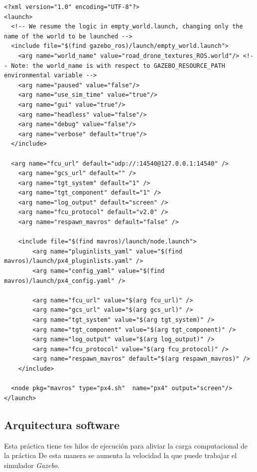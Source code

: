 \lstset{language=XML, breaklines=true, basicstyle=\footnotesize}
\begin{lstlisting}[frame=single]
<?xml version="1.0" encoding="UTF-8"?>
<launch>
  <!-- We resume the logic in empty_world.launch, changing only the name of the world to be launched -->
  <include file="$(find gazebo_ros)/launch/empty_world.launch">
    <arg name="world_name" value="road_drone_textures_ROS.world"/> <!-- Note: the world_name is with respect to GAZEBO_RESOURCE_PATH environmental variable -->
    <arg name="paused" value="false"/>
    <arg name="use_sim_time" value="true"/>
    <arg name="gui" value="true"/>
    <arg name="headless" value="false"/>
    <arg name="debug" value="false"/>
    <arg name="verbose" default="true"/>
  </include>

  <arg name="fcu_url" default="udp://:14540@127.0.0.1:14540" />
	<arg name="gcs_url" default="" />
	<arg name="tgt_system" default="1" />
	<arg name="tgt_component" default="1" />
	<arg name="log_output" default="screen" />
	<arg name="fcu_protocol" default="v2.0" />
	<arg name="respawn_mavros" default="false" />

	<include file="$(find mavros)/launch/node.launch">
		<arg name="pluginlists_yaml" value="$(find mavros)/launch/px4_pluginlists.yaml" />
		<arg name="config_yaml" value="$(find mavros)/launch/px4_config.yaml" />

		<arg name="fcu_url" value="$(arg fcu_url)" />
		<arg name="gcs_url" value="$(arg gcs_url)" />
		<arg name="tgt_system" value="$(arg tgt_system)" />
		<arg name="tgt_component" value="$(arg tgt_component)" />
		<arg name="log_output" value="$(arg log_output)" />
		<arg name="fcu_protocol" value="$(arg fcu_protocol)" />
		<arg name="respawn_mavros" default="$(arg respawn_mavros)" />
	</include>

  <node pkg="mavros" type="px4.sh"  name="px4" output="screen"/>
</launch>
\end{lstlisting}

\subsection{Arquitectura software}
Esta práctica tiene tes hilos de ejecución para aliviar la carga computacional de la práctica De esta manera se aumenta la velocidad  la que puede trabajar el simulador \textit{Gazebo}.

